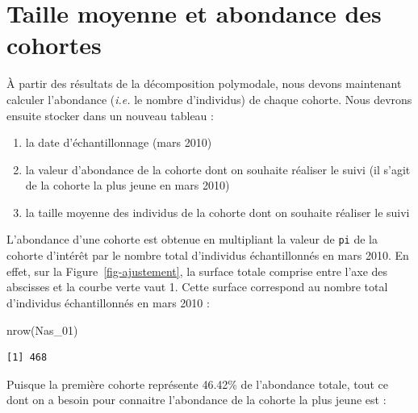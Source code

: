 \documentclass[
  a4paper,
  DIV=11,
  numbers=noendperiod,
  oneside]{scrreprt}
\newenvironment{Shaded}{}{}
\newcommand{\FunctionTok}[1]{\textcolor[rgb]{0.44,0.26,0.76}{#1}}
\newcommand{\NormalTok}[1]{\textcolor[rgb]{0.14,0.16,0.18}{#1}}
\providecommand{\tightlist}{%
  \setlength{\itemsep}{0pt}\setlength{\parskip}{0pt}}\usepackage{longtable,booktabs,array}
\begin{document}
\hypertarget{taille-moyenne-et-abondance-des-cohortes}{%
\section{Taille moyenne et abondance des
cohortes}\label{taille-moyenne-et-abondance-des-cohortes}}

À partir des résultats de la décomposition polymodale, nous devons
maintenant calculer l'abondance (\emph{i.e.} le nombre d'individus) de
chaque cohorte. Nous devrons ensuite stocker dans un nouveau tableau :

\begin{enumerate}
\def\labelenumi{\arabic{enumi}.}
\tightlist
\item
  la date d'échantillonnage (mars 2010)
\item
  la valeur d'abondance de la cohorte dont on souhaite réaliser le suivi
  (il s'agit de la cohorte la plus jeune en mars 2010)
\item
  la taille moyenne des individus de la cohorte dont on souhaite
  réaliser le suivi
\end{enumerate}

L'abondance d'une cohorte est obtenue en multipliant la valeur de
\texttt{pi} de la cohorte d'intérêt par le nombre total d'individus
échantillonnés en mars 2010. En effet, sur la
Figure~\ref{fig-ajustement}, la surface totale comprise entre l'axe des
abscisses et la courbe verte vaut 1. Cette surface correspond au nombre
total d'individus échantillonnés en mars 2010 :

\begin{Shaded}
\begin{Highlighting}[]
\FunctionTok{nrow}\NormalTok{(Nas\_01)}
\end{Highlighting}
\end{Shaded}

\begin{verbatim}
[1] 468
\end{verbatim}


Puisque la première cohorte représente 46.42\% de l'abondance
totale, tout
ce dont on a besoin pour connaitre l'abondance de la cohorte la plus
jeune est :
\end{document}
